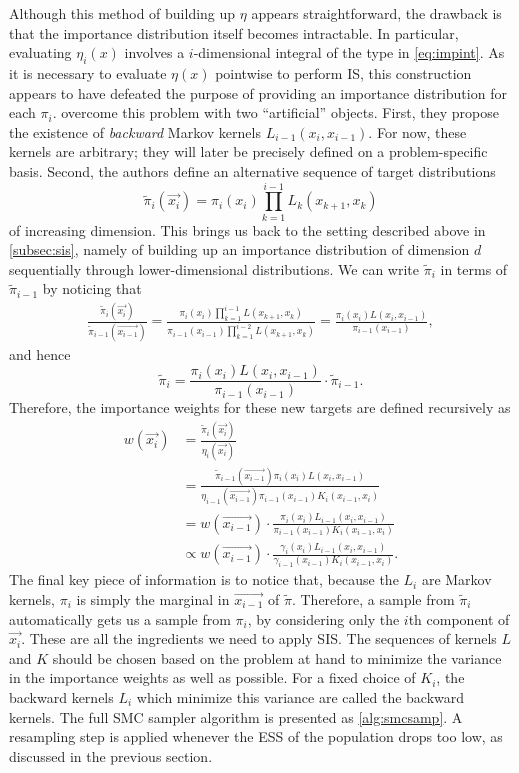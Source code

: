 {Although this method of building up $\eta$ appears straightforward, the
drawback is that the importance distribution itself becomes intractable. In
particular, evaluating $\eta_i(x)$ involves a $i$-dimensional integral of the
type in \cref{eq:impint}. As it is necessary to evaluate $\eta(x)$ pointwise to
perform \gls{IS}, this construction appears to have defeated the purpose of
providing an importance distribution for each $\pi_i$.
\textcite{del2006sequential} overcome this problem with two ``artificial''
objects. First, they propose the existence of \textit{backward} Markov kernels
$L_{i-1}(x_i, x_{i-1})$. For now, these kernels are arbitrary; they will later
be precisely defined on a problem-specific basis. Second, the authors define an
alternative sequence of target distributions
\[
  \tilde{\pi}_i(\vec{x_i}) = \pi_i(x_i) \prod_{k=1}^{i-1} L_k(x_{k+1}, x_k)
\]
of increasing dimension. This brings us back to the setting described above in
\cref{subsec:sis}, namely of building up an importance distribution of
dimension $d$ sequentially through lower-dimensional distributions. We can
write $\tilde{\pi}_i$ in terms of $\tilde{\pi}_{i-1}$ by noticing that
\begin{align*}
  \frac{\tilde{\pi}_i(\vec{x_i})}{\tilde{\pi}_{i-1}(\vec{x_{i-1}})} 
  = \frac{\pi_i(x_i) \prod_{k=1}^{i-1} L(x_{k+1}, x_k)}
  {\pi_{i-1}(x_{i-1}) \prod_{k=1}^{i-2} L(x_{k+1}, x_k)}
  = \frac{\pi_i(x_i) L(x_i, x_{i-1})}{\pi_{i-1}(x_{i-1})},
\end{align*}
and hence
\[
  \tilde{\pi}_i = \frac{\pi_i(x_i) L(x_i, x_{i-1})}{\pi_{i-1}(x_{i-1})} \cdot \tilde{\pi}_{i-1}.
\]
Therefore, the importance weights for these new targets are defined recursively as
\begin{align}
  w(\vec{x_i}) 
    &= \frac{\tilde{\pi}_i(\vec{x_i})}{\eta_i(\vec{x_i})} \\
    &= \frac{\tilde{\pi}_{i-1}(\vec{x_{i-1}}) \pi_i(x_i) L(x_i, x_{i-1})}
           {\eta_{i-1}(\vec{x_{i-1}}) \pi_{i-1}(x_{i-1}) K_i(x_{i-1}, x_i)} \\
    &= w(\vec{x_{i-1}}) \cdot
      \frac{\pi_i(x_i) L_{i-1}(x_i, x_{i-1})}
           {\pi_{i-1}(x_{i-1}) K_i(x_{i-1}, x_i)} \\
    &\propto w(\vec{x_{i-1}}) \cdot
      \frac{\gamma_i(x_i) L_{i-1}(x_i, x_{i-1})}
           {\gamma_{i-1}(x_{i-1}) K_i(x_{i-1}, x_i)}.
    \label{eq:smcwt}
\end{align}
The final key piece of information is to notice that, because the $L_i$ are
Markov kernels, $\pi_i$ is simply the marginal in $\vec{x_{i-1}}$ of
$\tilde{\pi}$. Therefore, a sample from $\tilde{\pi}_i$ automatically gets us a
sample from $\pi_i$, by considering only the $i$th component of $\vec{x_i}$.
These are all the ingredients we need to apply \gls{SIS}. The sequences of
kernels $L$ and $K$ should be chosen based on the problem at hand to minimize
the variance in the importance weights as well as possible. For a fixed choice
of $K_i$, the backward kernels $L_i$ which minimize this variance are called
the  backward kernels. The full \gls{SMC} sampler algorithm is
presented as \cref{alg:smcsamp}. A resampling step is applied whenever the
\gls{ESS} of the population drops too low, as discussed in the previous
section.

}
